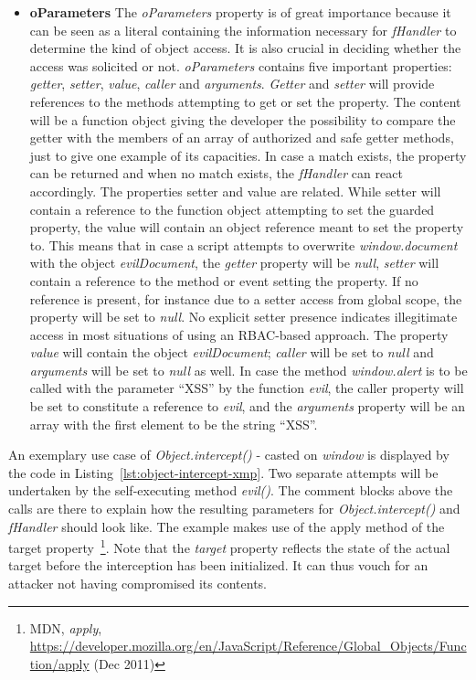 \begin{itemize}
      \item \textbf{oParameters} The \textit{oParameters} property is of great importance because it can be seen as a literal containing the information necessary for \textit{fHandler} to determine the kind of object access. It is also crucial in deciding whether the access was solicited or not. \textit{oParameters} contains five important properties: \textit{getter}, \textit{setter}, \textit{value}, \textit{caller} and \textit{arguments}. \textit{Getter} and \textit{setter} will provide references to the methods attempting to get or set the property. The content will be a function object giving the developer the possibility to compare the getter with the members of an array of authorized and safe getter methods, just to give one example of its capacities. In case a match exists, the property can be returned and when no match exists, the \textit{fHandler} can react accordingly. The properties setter and value are related. While setter will contain a reference to the function object attempting to set the guarded property, the value will contain an object reference meant to set the property to. This means that in case a script attempts to overwrite \textit{window.document} with the object \textit{evilDocument}, the \textit{getter} property will be \textit{null}, \textit{setter} will contain a reference to the method or event setting the property. If no reference is present, for instance due to a setter access from global scope, the property will be set to \textit{null}. No explicit setter presence indicates illegitimate access in most situations of using an RBAC-based approach. The property \textit{value} will contain the object \textit{evilDocument}; \textit{caller} will be set to \textit{null} and \textit{arguments} will be set to \textit{null} as well. In case the method \textit{window.alert} is to be called with the parameter ``XSS'' by the function \textit{evil}, the caller property will be set to constitute a reference to \textit{evil}, and the \textit{arguments} property will be an array with the first element to be the string ``XSS''. 
    \end{itemize}

    An exemplary use case of \textit{Object.intercept()} - casted on \textit{window} is displayed by the code in Listing~\ref{lst:object-intercept-xmp}. Two separate attempts will be undertaken by the self-executing method \textit{evil()}. The comment blocks above the calls are there to explain how the resulting parameters for \textit{Object.intercept()} and \textit{fHandler} should look like. The example makes use of the apply method of the target property~\footnote{MDN, \textit{apply}, \url{https://developer.mozilla.org/en/JavaScript/Reference/Global\_Objects/Function/apply} (Dec 2011)}. Note that the \textit{target} property reflects the state of the actual target before the interception has been initialized. It can thus vouch for an attacker not having compromised its contents.\\

